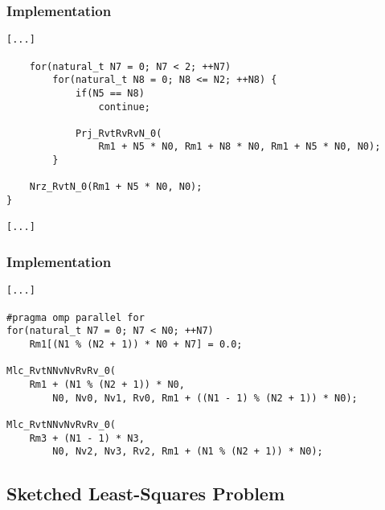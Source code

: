 \begin{frame}[fragile] %
    \frametitle{Implementation}

\begin{lstlisting}[style=cpp]
    [...]

    for(natural_t N7 = 0; N7 < 2; ++N7)
        for(natural_t N8 = 0; N8 <= N2; ++N8) {
            if(N5 == N8)
                continue;

            Prj_RvtRvRvN_0(
                Rm1 + N5 * N0, Rm1 + N8 * N0, Rm1 + N5 * N0, N0);
        }

    Nrz_RvtN_0(Rm1 + N5 * N0, N0);
}

[...]
\end{lstlisting}

\end{frame}

\begin{frame}[fragile] %
    \frametitle{Implementation}

\begin{lstlisting}[style=cpp]
[...]

#pragma omp parallel for
for(natural_t N7 = 0; N7 < N0; ++N7)
    Rm1[(N1 % (N2 + 1)) * N0 + N7] = 0.0;

Mlc_RvtNNvNvRvRv_0(
    Rm1 + (N1 % (N2 + 1)) * N0,
        N0, Nv0, Nv1, Rv0, Rm1 + ((N1 - 1) % (N2 + 1)) * N0);

Mlc_RvtNNvNvRvRv_0(
    Rm3 + (N1 - 1) * N3,
        N0, Nv2, Nv3, Rv2, Rm1 + (N1 % (N2 + 1)) * N0);
\end{lstlisting}

\end{frame}

\subsection{Sketched Least-Squares Problem}

